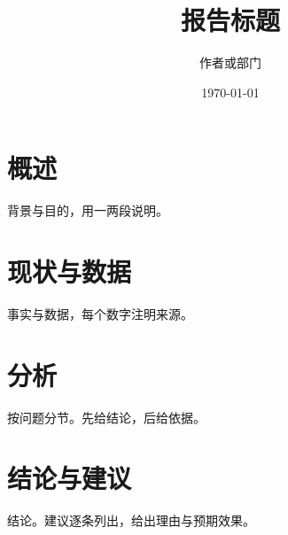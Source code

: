 \documentclass[11pt]{ctexart}
\title{报告标题}
\author{作者或部门}
\date{\today}
\begin{document}
\maketitle
\tableofcontents

\section{概述}
背景与目的，用一两段说明。

\section{现状与数据}
事实与数据，每个数字注明来源。

\section{分析}
按问题分节。先给结论，后给依据。

\section{结论与建议}
结论。建议逐条列出，给出理由与预期效果。
\end{document}
